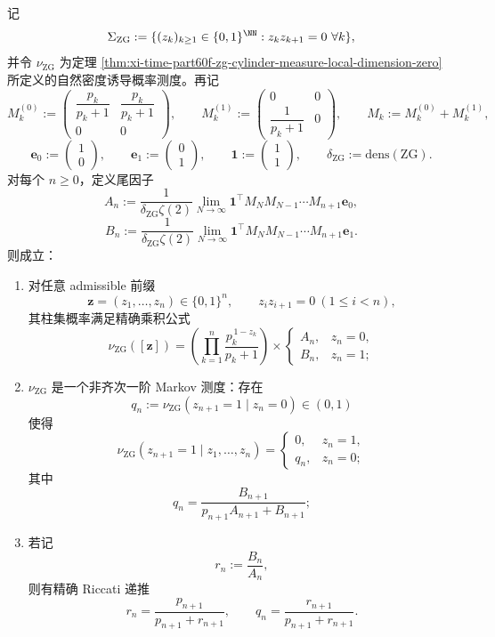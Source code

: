 \begin{theorem}\label{thm:conclusion-zg-density-exact-inhomogeneous-markov}
记
\[
\Sigma_{\mathrm{ZG}}
:=
\{(z_k)_{k\ge 1}\in\{0,1\}^{\NN}: z_kz_{k+1}=0\ \forall k\},
\]
并令 \(\nu_{\mathrm{ZG}}\) 为定理 \ref{thm:xi-time-part60f-zg-cylinder-measure-local-dimension-zero} 所定义的自然密度诱导概率测度。再记
\[
M_k^{(0)}
:=
\begin{pmatrix}
\dfrac{p_k}{p_k+1} & \dfrac{p_k}{p_k+1}\\[2mm]
0&0
\end{pmatrix},
\qquad
M_k^{(1)}
:=
\begin{pmatrix}
0&0\\[2mm]
\dfrac{1}{p_k+1}&0
\end{pmatrix},
\qquad
M_k:=M_k^{(0)}+M_k^{(1)},
\]
\[
\mathbf e_0:=\begin{pmatrix}1\\0\end{pmatrix},
\qquad
\mathbf e_1:=\begin{pmatrix}0\\1\end{pmatrix},
\qquad
\mathbf 1:=\begin{pmatrix}1\\1\end{pmatrix},
\qquad
\delta_{\mathrm{ZG}}:=\mathrm{dens}(\mathrm{ZG}).
\]
对每个 \(n\ge 0\)，定义尾因子
\[
A_n
:=
\frac{1}{\delta_{\mathrm{ZG}}\zeta(2)}
\lim_{N\to\infty}\mathbf 1^\top M_NM_{N-1}\cdots M_{n+1}\mathbf e_0,
\]
\[
B_n
:=
\frac{1}{\delta_{\mathrm{ZG}}\zeta(2)}
\lim_{N\to\infty}\mathbf 1^\top M_NM_{N-1}\cdots M_{n+1}\mathbf e_1.
\]
则成立：
\begin{enumerate}
  \item 对任意 admissible 前缀
  \[
  \mathbf z=(z_1,\dots,z_n)\in\{0,1\}^n,
  \qquad z_iz_{i+1}=0\ (1\le i<n),
  \]
  其柱集概率满足精确乘积公式
  \[
  \nu_{\mathrm{ZG}}([\mathbf z])
  =
  \left(
  \prod_{k=1}^{n}\frac{p_k^{\,1-z_k}}{p_k+1}
  \right)
  \times
  \begin{cases}
  A_n,& z_n=0,\\
  B_n,& z_n=1;
  \end{cases}
  \]
  \item \(\nu_{\mathrm{ZG}}\) 是一个非齐次一阶 Markov 测度：存在
  \[
  q_n:=\nu_{\mathrm{ZG}}(z_{n+1}=1\mid z_n=0)\in(0,1)
  \]
  使得
  \[
  \nu_{\mathrm{ZG}}(z_{n+1}=1\mid z_1,\dots,z_n)
  =
  \begin{cases}
  0,& z_n=1,\\
  q_n,& z_n=0;
  \end{cases}
  \]
  其中
  \[
  q_n=\frac{B_{n+1}}{p_{n+1}A_{n+1}+B_{n+1}};
  \]
  \item 若记
  \[
  r_n:=\frac{B_n}{A_n},
  \]
  则有精确 Riccati 递推
  \[
  r_n=\frac{p_{n+1}}{p_{n+1}+r_{n+1}},
  \qquad
  q_n=\frac{r_{n+1}}{p_{n+1}+r_{n+1}}.
  \]
\end{enumerate}
\end{theorem}
